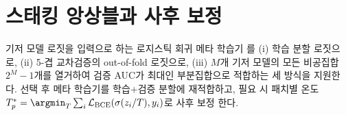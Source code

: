 
\section{스태킹 앙상블과 사후 보정}
\label{sec:model-stacking}

기저 모델 로짓을 입력으로 하는 로지스틱 회귀 메타 학습기 \cite{wolpert1992stacked}를 (i) 학습 분할 로짓으로, (ii) 5-겹 교차검증의 out-of-fold 로짓으로, (iii) $M$개 기저 모델의 모든 비공집합 $2^M - 1$개를 열거하여 검증 AUC가 최대인 부분집합으로 적합하는 세 방식을 지원한다. 선택 후 메타 학습기를 학습+검증 분할에 재적합하고, 필요 시 패치별 온도 $T_p^* = \argmin_T \sum_i \mathcal{L}_{\mathrm{BCE}}(\sigma(z_i/T), y_i)$로 사후 보정 \cite{guo2017calibration}한다.
